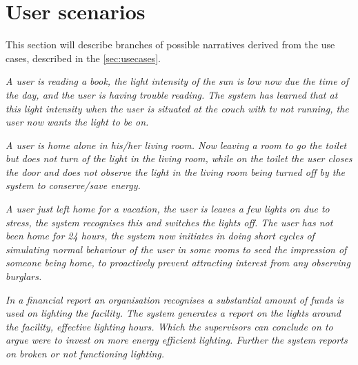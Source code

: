 \section{User scenarios}\label{sec:userscenarious}


This section will describe branches of possible narratives derived from the use cases, described in the \cref{sec:usecases}.

\textit{A user is reading a book, the light intensity of the sun is low now due the time of the day, and the user is having trouble reading. The system has learned that at this light intensity when the user is situated at the couch with tv not running, the user now wants the light to be on.}

\textit{A user is home alone in his/her living room. Now leaving a room to go the toilet but does not turn of the light in the living room, while on the toilet the user closes the door and does not observe the light in the living room being turned off by the system to conserve/save energy.}

\textit{A user just left home for a vacation, the user is leaves a few lights on due to stress, the system recognises this and switches the lights off. The user has not been home for 24 hours, the system now initiates in doing short cycles of simulating normal behaviour of the user in some rooms to seed the impression of someone being home, to proactively prevent attracting interest from any observing burglars.}

\textit{In a financial report an organisation recognises a substantial amount of funds is used on lighting the facility. The system generates a report on the lights around the facility, effective lighting hours. Which the supervisors can conclude on to argue were to invest on more energy efficient lighting. Further the system reports on broken or not functioning lighting.}



